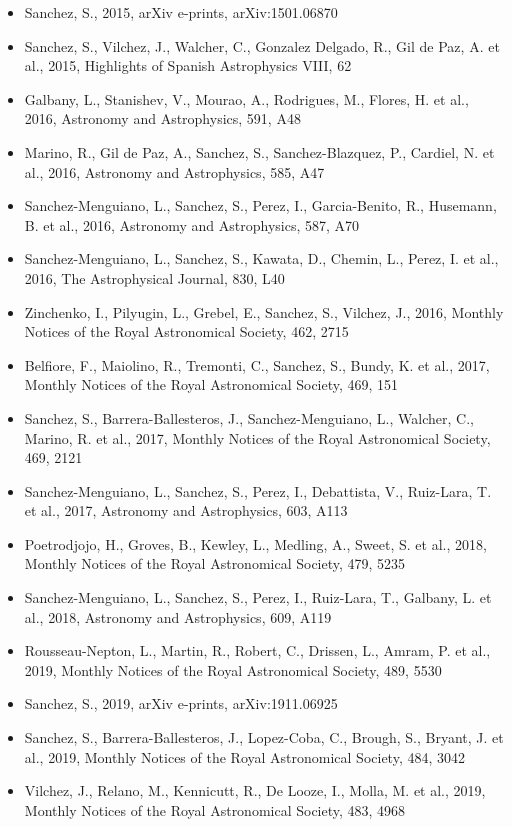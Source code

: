 \documentclass{letter}
\begin{document}
\begin{enumerate}
\begin{itemize}
\item Sanchez, S., 2015, arXiv e-prints, arXiv:1501.06870
\item Sanchez, S., Vilchez, J., Walcher, C., Gonzalez Delgado, R., Gil de Paz, A. et al., 2015, Highlights of Spanish Astrophysics VIII, 62
\item Galbany, L., Stanishev, V., Mourao, A., Rodrigues, M., Flores, H. et al., 2016, Astronomy and Astrophysics, 591, A48
\item Marino, R., Gil de Paz, A., Sanchez, S., Sanchez-Blazquez, P., Cardiel, N. et al., 2016, Astronomy and Astrophysics, 585, A47
\item Sanchez-Menguiano, L., Sanchez, S., Perez, I., Garcia-Benito, R., Husemann, B. et al., 2016, Astronomy and Astrophysics, 587, A70
\item Sanchez-Menguiano, L., Sanchez, S., Kawata, D., Chemin, L., Perez, I. et al., 2016, The Astrophysical Journal, 830, L40
\item Zinchenko, I., Pilyugin, L., Grebel, E., Sanchez, S., Vilchez, J., 2016, Monthly Notices of the Royal Astronomical Society, 462, 2715
\item Belfiore, F., Maiolino, R., Tremonti, C., Sanchez, S., Bundy, K. et al., 2017, Monthly Notices of the Royal Astronomical Society, 469, 151
\item Sanchez, S., Barrera-Ballesteros, J., Sanchez-Menguiano, L., Walcher, C., Marino, R. et al., 2017, Monthly Notices of the Royal Astronomical Society, 469, 2121
\item Sanchez-Menguiano, L., Sanchez, S., Perez, I., Debattista, V., Ruiz-Lara, T. et al., 2017, Astronomy and Astrophysics, 603, A113
\item Poetrodjojo, H., Groves, B., Kewley, L., Medling, A., Sweet, S. et al., 2018, Monthly Notices of the Royal Astronomical Society, 479, 5235
\item Sanchez-Menguiano, L., Sanchez, S., Perez, I., Ruiz-Lara, T., Galbany, L. et al., 2018, Astronomy and Astrophysics, 609, A119
\item Rousseau-Nepton, L., Martin, R., Robert, C., Drissen, L., Amram, P. et al., 2019, Monthly Notices of the Royal Astronomical Society, 489, 5530
\item Sanchez, S., 2019, arXiv e-prints, arXiv:1911.06925
\item Sanchez, S., Barrera-Ballesteros, J., Lopez-Coba, C., Brough, S., Bryant, J. et al., 2019, Monthly Notices of the Royal Astronomical Society, 484, 3042
\item Vilchez, J., Relano, M., Kennicutt, R., De Looze, I., Molla, M. et al., 2019, Monthly Notices of the Royal Astronomical Society, 483, 4968

\end{itemize}
\end{enumerate}
\end{document}
